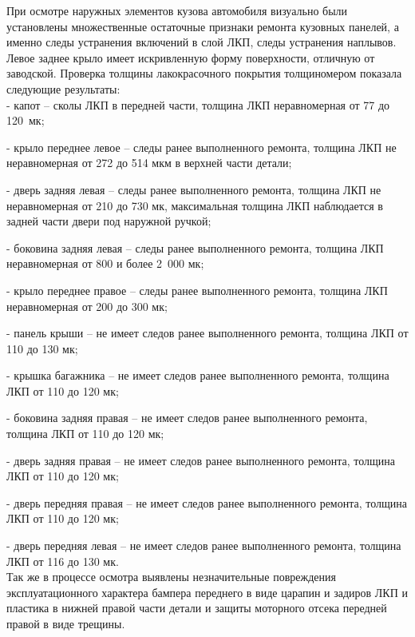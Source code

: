  
При осмотре наружных элементов кузова  автомобиля визуально были установлены множественные остаточные признаки ремонта кузовных панелей, а именно следы устранения включений в слой ЛКП, следы устранения наплывов. Левое заднее крыло имеет искривленную форму поверхности, отличную от заводской.  Проверка толщины лакокрасочного покрытия  толщиномером  показала следующие результаты:\\

- капот – сколы ЛКП в передней части, толщина ЛКП неравномерная от 77 до 120 мк;

- крыло переднее левое – следы ранее выполненного ремонта, толщина ЛКП не неравномерная от 272 до 514 мкм в верхней части детали;

- дверь задняя левая – следы ранее выполненного ремонта, толщина ЛКП не неравномерная от 210 до 730 мк, максимальная толщина ЛКП наблюдается в задней части двери под наружной ручкой;

- боковина задняя левая – следы ранее выполненного ремонта, толщина ЛКП  неравномерная от 800  и более 2 000 мк;

- крыло переднее правое – следы ранее выполненного ремонта, толщина ЛКП неравномерная от 200 до 300 мк;

- панель крыши – не имеет следов ранее выполненного ремонта, толщина ЛКП от 110 до 130 мк;

- крышка багажника – не имеет следов ранее выполненного ремонта, толщина ЛКП от 110 до 120 мк;

- боковина задняя правая – не имеет следов ранее выполненного ремонта, толщина ЛКП от 110 до 120 мк;

- дверь задняя правая – не имеет следов ранее выполненного ремонта, толщина ЛКП от 110 до 120 мк;

- дверь передняя правая – не имеет следов ранее выполненного ремонта, толщина ЛКП от 110 до 120 мк;

- дверь передняя левая – не имеет следов ранее выполненного ремонта, толщина ЛКП от 116 до 130 мк.\\

Так же в процессе осмотра выявлены незначительные повреждения эксплуатационного характера бампера переднего в виде царапин и задиров  ЛКП и пластика в нижней правой части детали и защиты моторного отсека передней правой в виде трещины.\\

